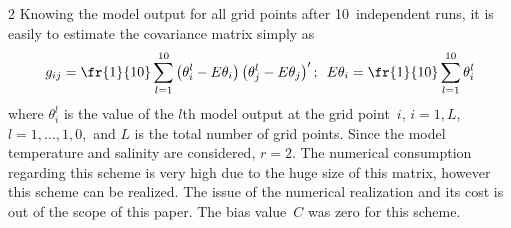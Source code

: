 \begin{multicols}{2}
Knowing the model output for all grid points after 10~independent runs, it 
is easily to estimate the covariance matrix simply as
$$ 
g_{ij} =\fr{1}{10} \sum\limits_{l=1}^{10}\left(\theta_{i}^{l}  -E\theta_{i} \right)
\left(\theta_{j}^{l} -E\theta_{j} \right)'; \enskip
E\theta_{i} =\fr{1}{10} \sum_{l=1}^{10}\theta_{i}^{l}  
$$
where  $\theta_{i}^{l} $ is the value of the $l$th model output at the grid point~$i$, 
$i=1,L$, $l=1,\ldots , 1,0,$ and $L$ is the total number of grid points. 
Since the model temperature and salinity are considered, $r=2$. 
The numerical consumption regarding this scheme is very high due to the huge size of this matrix, 
however this scheme can be realized. The issue of the numerical realization and its 
cost is out of the scope of this paper. The bias value~$C$ was zero for this scheme.


\end{multicols}

